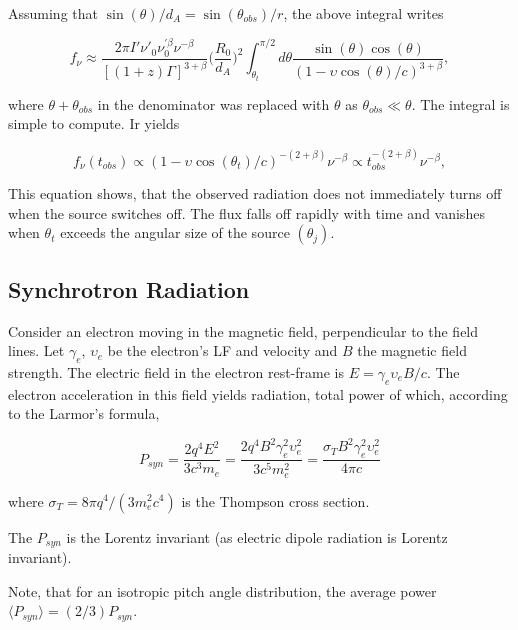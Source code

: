 Assuming that $\sin(\theta)/d_{A} = \sin(\theta_{obs})/r$, the above integral writes 

\begin{equation}
f_{\nu} \approx \frac{ 2\pi I' \nu' _0 \nu_{0}^{'\beta}\nu^{-\beta} }{[(1+z)\Gamma]^{3+\beta}} \Big( \frac{R_0}{d_A} \Big)^2 \int_{\theta_t}^{\pi / 2} d\theta \frac{\sin(\theta)\cos(\theta)}{(1-\upsilon\cos(\theta)/c)^{3+\beta}},
\end{equation}

where $\theta+\theta_{obs}$ in the denominator was replaced with $\theta$ as $\theta_{obs}\ll\theta$.
The integral is simple to compute. Ir yields

\begin{equation}
f_{\nu}(t_{obs}) \propto (1 - \upsilon\cos(\theta_t)/c)^{-(2 + \beta)}\nu^{-\beta} \propto t_{obs}^{-(2+\beta)} \nu^{-\beta},
\end{equation}

This equation shows, that the observed radiation does not immediately turns off when the source switches off. The flux falls off rapidly with time and vanishes when $\theta_t$ exceeds the angular size of the source $(\theta_j)$.


\subsection{Synchrotron Radiation}


Consider an electron moving in the magnetic field, perpendicular to the field lines.
Let $\gamma_e$, $\upsilon_e$ be the electron's \ac{LF} and velocity and $B$ the magnetic field strength.
The electric field in the electron rest-frame is $E=\gamma_e \upsilon_e B /c$. The electron acceleration in this field yields radiation, total power of which, according to the Larmor's formula, 

\begin{equation}
P_{syn} = \frac{2q^4E^2}{3c^3m_e}=\frac{2q^4B^2\gamma_e^2\upsilon_e^2}{3c^5m_e^2}=\frac{\sigma_TB^2\gamma_e^2\upsilon_e^2}{4\pi c}
\end{equation}

where $\sigma_T = 8\pi q^4 / (3m_e^2c^4)$ is the Thompson cross section. 

The $P_{syn}$ is the Lorentz invariant (as electric dipole radiation is Lorentz invariant).

Note, that for an isotropic pitch angle distribution, the average power $\langle P_{syn} \rangle = (2/3)P_{syn}$.

